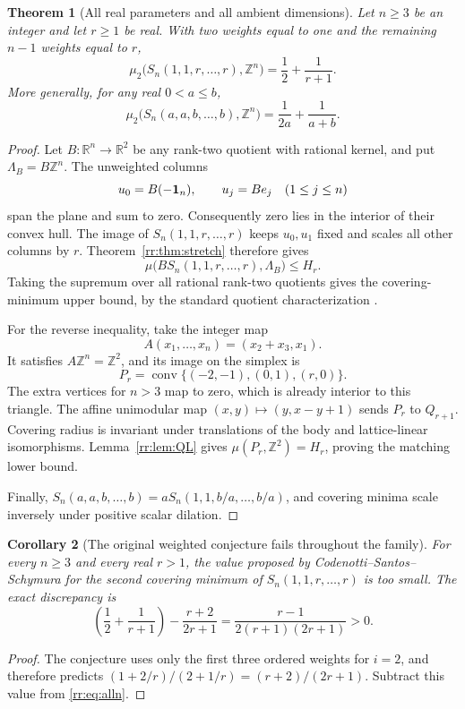 \documentclass[11pt,a4paper]{article}
\newtheorem{theorem}{Theorem}[section]
\newtheorem{corollary}[theorem]{Corollary}
\theoremstyle{remark}\newtheorem{remark}[theorem]{Remark}
\DeclareMathOperator{\conv}{conv}
\newcommand{\R}{\mathbb R}\newcommand{\Z}{\mathbb Z}
\begin{document}
\begin{theorem}[All real parameters and all ambient dimensions]
\label{rr:thm:alln}
Let $n\ge3$ be an integer and let $r\ge1$ be real.  With two
weights equal to one and the remaining $n-1$ weights equal to $r$,
\begin{equation}\label{rr:eq:alln}
 \boxed{\displaystyle
 \mu_2\bigl(S_n(1,1,r,\ldots,r),\Z^n\bigr)
 =\frac12+\frac1{r+1}.}
\end{equation}
More generally, for any real $0<a\le b$,
\begin{equation}\label{rr:eq:ab}
 \boxed{\displaystyle
 \mu_2\bigl(S_n(a,a,b,\ldots,b),\Z^n\bigr)
 =\frac1{2a}+\frac1{a+b}.}
\end{equation}
\end{theorem}
\begin{proof}
Let $B:\R^n\to\R^2$ be any rank-two quotient with rational
kernel, and put $\Lambda_B=B\Z^n$.  The unweighted columns
\[
 u_0=B(-\mathbf1_n),\qquad u_j=Be_j\quad(1\le j\le n)
\]
span the plane and sum to zero.  Consequently zero lies in the
interior of their convex hull.  The image of
$S_n(1,1,r,\ldots,r)$ keeps $u_0,u_1$ fixed and scales all other
columns by $r$.  Theorem~\ref{rr:thm:stretch} therefore gives
\[
 \mu\bigl(BS_n(1,1,r,\ldots,r),\Lambda_B\bigr)\le H_r.
\]
Taking the supremum over all rational rank-two quotients gives
the covering-minimum upper bound, by the standard quotient
characterization \cite[Section 1]{CSS}.

For the reverse inequality, take the integer map
\[
 A(x_1,\ldots,x_n)=(x_2+x_3,x_1).
\]
It satisfies $A\Z^n=\Z^2$, and its image on the simplex is
\[
 P_r=\conv\{(-2,-1),(0,1),(r,0)\}.
\]
The extra vertices for $n>3$ map to zero, which is already
interior to this triangle.  The affine unimodular map
$(x,y)\mapsto(y,x-y+1)$ sends $P_r$ to $Q_{r+1}$.
Covering radius is invariant under translations of the body
and lattice-linear isomorphisms.  Lemma~\ref{rr:lem:QL} gives
$\mu(P_r,\Z^2)=H_r$, proving the matching lower bound.

Finally,
$S_n(a,a,b,\ldots,b)=aS_n(1,1,b/a,\ldots,b/a)$, and covering
minima scale inversely under positive scalar dilation.
\end{proof}

\begin{corollary}[The original weighted conjecture fails throughout the family]
\label{rr:cor:conjecture}
For every $n\ge3$ and every real $r>1$, the value proposed by
Codenotti--Santos--Schymura \cite[Conjecture 5.3]{CSS} for the
second covering minimum of $S_n(1,1,r,\ldots,r)$ is too small.
The exact discrepancy is
\begin{equation}\label{rr:eq:gap}
 \left(\frac12+\frac1{r+1}\right)-\frac{r+2}{2r+1}
 =\frac{r-1}{2(r+1)(2r+1)}>0.
\end{equation}
\end{corollary}
\begin{proof}
The conjecture uses only the first three ordered weights for
$i=2$, and therefore predicts
$(1+2/r)/(2+1/r)=(r+2)/(2r+1)$.  Subtract this value from
\eqref{rr:eq:alln}.
\end{proof}
\end{document}
